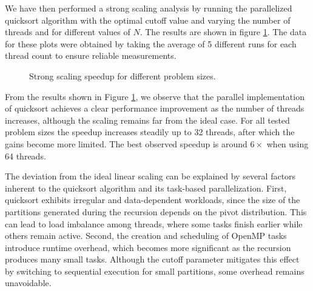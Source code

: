 \documentclass[unicode,10pt,a4paper,oneside,numbers=endperiod,openany]{scrartcl}
\begin{document}
We have then performed a strong scaling analysis by running the parallelized quicksort algorithm with the optimal cutoff value and varying the number of threads and for different values of $N$. The results are shown in figure \ref{fig:quicksort_speedup}. The data for these plots were obtained by taking the average of 5 different runs for each thread count to ensure reliable measurements.
\begin{figure}[h]
\centering
{}
\caption{Strong scaling speedup for different problem sizes.}
\label{fig:quicksort_speedup}
\end{figure}

From the results shown in Figure \ref{fig:quicksort_speedup}, we observe that the parallel implementation of quicksort achieves a clear performance improvement as the number of threads increases, although the scaling remains far from the ideal case. For all tested problem sizes the speedup increases steadily up to 32 threads, after which the gains become more limited. The best observed speedup is around $6\times$ when using 64 threads.

The deviation from the ideal linear scaling can be explained by several factors inherent to the quicksort algorithm and its task-based parallelization. First, quicksort exhibits irregular and data-dependent workloads, since the size of the partitions generated during the recursion depends on the pivot distribution. This can lead to load imbalance among threads, where some tasks finish earlier while others remain active. Second, the creation and scheduling of OpenMP tasks introduce runtime overhead, which becomes more significant as the recursion produces many small tasks. Although the cutoff parameter mitigates this effect by switching to sequential execution for small partitions, some overhead remains unavoidable.
\printbibliography
\end{document}
